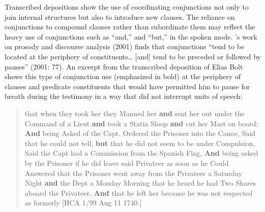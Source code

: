 Transcribed depositions show the use of coordinating conjunctions not only to join internal structures but also to introduce new clauses. The reliance on conjunctions to compound clauses rather than subordinate them may reflect the heavy use of conjunctions such as “and,” and “but,” in the spoken mode. \citeauthor{Wennerstron2001}’s work on prosody and discourse analysis (2001) finds that conjunctions “tend to be located at the periphery of constituents… [and] tend to be preceded or followed by pauses” (2001: 77). An excerpt from the transcribed deposition of Elias Bolt shows this type of conjunction use (emphasized in bold) at the periphery of clauses and predicate constituents that would have permitted him to pause for breath during the testimony in a way that did not interrupt units of speech:

\begin{quotation}
that when they took her they Manned her \textbf{and} sent her out under the Command of a Lieut \textbf{and} took a Statia Sloop \textbf{and} cut her Mast on board; \textbf{And} being Asked of the Capt. Ordered the Prisoner into the Canoe, Said that he could not tell, \textbf{but} that he did not seem to be under Compulsion, Said the Capt had a Commission from the Spanish Flag, \textbf{And} being asked by the Prisoner if he did leave said Privateer as soon as he Could Answered that the Prisoner went away from the Privateer a Saturday Night \textbf{and} the Dept a Monday Morning that he heard he had Two Shares aboard the Privateer, \textbf{And} that he left her because he was not respected as formerly [HCA 1/99  Aug 11 1740.]
\end{quotation}

